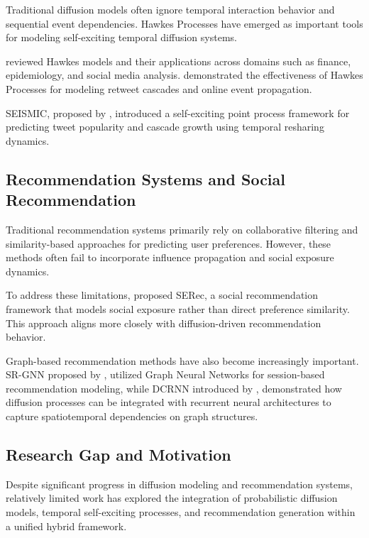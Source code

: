 \documentclass{article}
\begin{document}
Traditional diffusion models often ignore temporal interaction behavior and sequential event dependencies. Hawkes Processes have emerged as important tools for modeling self-exciting temporal diffusion systems.

\cite{laub2025hawkes} reviewed Hawkes models and their applications across domains such as finance, epidemiology, and social media analysis. \cite{rizoiu2017hawkes} demonstrated the effectiveness of Hawkes Processes for modeling retweet cascades and online event propagation.

SEISMIC, proposed by \cite{zhao2015seismic}, introduced a self-exciting point process framework for predicting tweet popularity and cascade growth using temporal resharing dynamics.

\subsection{Recommendation Systems and Social Recommendation}

Traditional recommendation systems primarily rely on collaborative filtering and similarity-based approaches for predicting user preferences. However, these methods often fail to incorporate influence propagation and social exposure dynamics.

To address these limitations, \cite{wang2018collaborative} proposed SERec, a social recommendation framework that models social exposure rather than direct preference similarity. This approach aligns more closely with diffusion-driven recommendation behavior.

Graph-based recommendation methods have also become increasingly important. SR-GNN proposed by \cite{wu2019session}, utilized Graph Neural Networks for session-based recommendation modeling, while DCRNN introduced by \cite{li2017diffusion}, demonstrated how diffusion processes can be integrated with recurrent neural architectures to capture spatiotemporal dependencies on graph structures.

\subsection{Research Gap and Motivation}

Despite significant progress in diffusion modeling and recommendation systems, relatively limited work has explored the integration of probabilistic diffusion models, temporal self-exciting processes, and recommendation generation within a unified hybrid framework.
\end{document}
